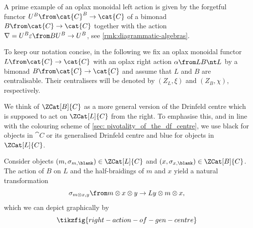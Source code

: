 A prime example of an oplax monoidal left action is given
by the forgetful functor \(U^B \from \cat{C}^B \to \cat{C}\)
of a bimonad \(B \from \cat{C} \to \cat{C}\) together with the action \(\nabla = U^B \varepsilon \from B U^B \to U^B\),
see \cref{rmk:diagrammatic-algebras}.

\begin{hypothesis}
  To keep our notation concise, in the following we
  fix an oplax monoidal functor \(L \from \cat{C} \to \cat{C}\)
  with an oplax right action \(\alpha \from LB \nt L\) by a bimonad \(B\from \cat{C} \to \cat{C}\)
  and assume that \(L\) and \(B\) are centralisable.
  Their centralisers will be denoted by \((Z_L, \xi)\) and \((Z_B, \chi)\), respectively.
\end{hypothesis}

We think of \(\ZCat[B]{C}\) as a more general version of the Drinfeld centre
which is supposed to act on \(\ZCat[L]{C}\) from the right.
To emphasise this, and in line with the colouring scheme of \cref{sec: pivotality_of_the_df_centre}, we use black for objects in \(\cat{C}\) or its generalised Drinfeld centre and blue for objects in \(\ZCat[L]{C}\).

Consider objects \((m, \sigma_{m,\blank}) \in \ZCat[L]{C}\) and \((x, \sigma_{x,\blank}) \in \ZCat[B]{C}\).
The action of \(B\) on \(L\) and the half-braidings of \(m\) and \(x\) yield
a natural transformation
\[
  \sigma_{m \otimes x, y} \from m \otimes x \otimes y \to Ly \otimes m \otimes x,
\]
which we can depict graphically by
\begin{equation}\label{eq:right-action-of-gen-centre}
  \tikzfig{right-action-of-gen-centre}
\end{equation}

